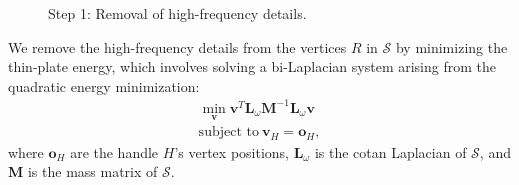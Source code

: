 \documentclass[11pt]{amsart}
\begin{document}
\begin{figure}
   \centering
\hspace{0.5cm}
   \caption{Step 1: Removal of high-frequency details.}
   \label{fig:smoothing}
\end{figure}

We remove the high-frequency details from the vertices $R$ in $\mathcal{S}$ by
minimizing the thin-plate energy, which involves solving a bi-Laplacian system
arising from the quadratic energy minimization:
\begin{eqnarray*} \min_\textbf{v} \textbf{v}^T \textbf{L}_\omega \textbf{M}^{-1} \textbf{L}_\omega \textbf{v} \\
 \mbox{subject to}
 \ \textbf{v}_H = \textbf{o}_H,
\end{eqnarray*}
where $\textbf{o}_H$ are the handle $H$'s vertex positions, $\textbf{L}_\omega$
is the cotan Laplacian of $\mathcal{S}$, and \textbf{M} is the mass matrix of
$\mathcal{S}$.
\end{document}
